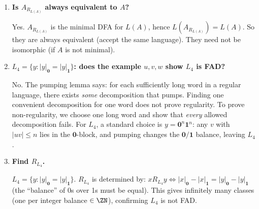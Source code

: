 \begin{enumerate}[{2.}1.]
In Example 1.5 (vending machine), states track deposited amount in
\[
T=\{0,5,10,15,20,25,30,35,40,45,50\}
\]
(capped at 50), and final states are amounts $\ge30$.

\textbf{$R^M$.}
\[
x R^M y \Longleftrightarrow \DBAR(s_0,x)=\DBAR(s_0,y).
\]
So $R^M$ has one class for each amount in $T$ (11 classes).

\textbf{$R_{L(M)}$.}
All classes for amounts $<30$ remain distinct, while all amounts $\ge30$
merge into one Nerode class.

Why amounts $<30$ are distinct: if $t_1<t_2<30$, append coins totaling
$30-t_2$ (possible with $\mathbf n,\mathbf d,\mathbf q$); then from $t_2$ the result
is accepted (reaches 30), while from $t_1$ it is still $<30$ and rejected.

Why amounts $\ge30$ are equivalent: once at least 30 cents has been deposited,
any further input keeps the machine in accepting territory.

Hence $R_{L(M)}$ has 7 classes:
\[
[0],[5],[10],[15],[20],[25],\ [\ge30].
\]
So $R^M$ is strictly finer than $R_{L(M)}$.

\item \textbf{Is $A_{R_{L(A)}}$ always equivalent to $A$?}

Yes. $A_{R_{L(A)}}$ is the minimal DFA for $L(A)$, hence $L(A_{R_{L(A)}})=L(A)$. So they are always equivalent (accept the same language). They need not be isomorphic (if $A$ is not minimal).

\item \textbf{$L_4=\{y:|y|_\mathbf{0}=|y|_\mathbf{1}\}$: does the example $u,v,w$ show $L_4$ is FAD?}

No. The pumping lemma says: for each sufficiently long word in a regular language, there exists \emph{some} decomposition that pumps. Finding one convenient decomposition for one word does not prove regularity.
To prove non-regularity, we choose one long word and show that \emph{every} allowed decomposition fails. For $L_4$, a standard choice is $y=\mathbf{0}^n\mathbf{1}^n$: any $v$ with $|uv|\le n$ lies in the $\mathbf{0}$-block, and pumping changes the $\mathbf{0}/\mathbf{1}$ balance, leaving $L_4$.

\item \textbf{Find $R_{L_4}$.}

$L_4=\{y:|y|_\mathbf{0}=|y|_\mathbf{1}\}$. $R_{L_4}$ is determined by: $x R_{L_4} y\Leftrightarrow|x|_\mathbf{0}-|x|_\mathbf{1}=|y|_\mathbf{0}-|y|_\mathbf{1}$ (the ``balance'' of 0s over 1s must be equal). This gives infinitely many classes (one per integer balance $\in\ZN$), confirming $L_4$ is not FAD.


\end{enumerate}

